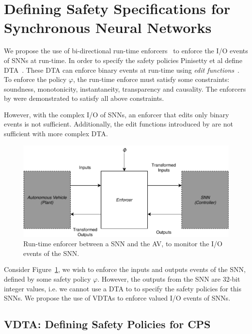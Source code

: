 \section{Defining Safety Specifications for Synchronous Neural Networks}
\label{sec:definitions}

We propose the use of bi-directional run-time enforcers~\cite{recps} to enforce the I/O events of \acp{SNN} at run-time.
In order to specify the safety policies Pinisetty et al define \acf{DTA}~\cite{recps}.
These \ac{DTA} can enforce binary events at run-time using \textit{edit functions}~\cite{recps}.
To enforce the policy $\varphi$, the run-time enforce must satisfy some constraints: soundness, monotonicity, instantaneity, transparency and causality.
The enforcers by \cite{recps} were demonstrated to satisfy all above constraints.

However, with the complex I/O of \acp{SNN}, an enforcer that edits only binary events is not sufficient.
Additionally, the edit functions introduced by \cite{recps} are not sufficient with more complex \ac{DTA}.

\begin{figure}[H]
	\centering
	\includegraphics[width=0.8\linewidth]{Content/Fig/RE.pdf}
	\caption{Run-time enforcer between a \ac{SNN} and the \acf{AV}, to monitor the I/O events of the \ac{SNN}. \label{fig:re}}
\end{figure}

Consider Figure~\ref{fig:re}, we wish to enforce the inputs and outputs events of the \ac{SNN}, defined by some safety policy $\varphi$.
However, the outputs from the \ac{SNN} are 32-bit integer values, i.e. we cannot use a \ac{DTA} to to specify the safety policies for this \acp{SNN}.
We propose the use of \acfp{VDTA} to enforce valued I/O events of \acp{SNN}. 

\subsection{\acf{VDTA}: Defining Safety Policies for \ac{CPS}}

